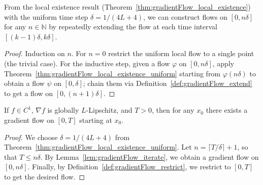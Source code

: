 \begin{lemma}
  \label{lem:gradientFlow_iterate}
  \leanok{}
  From the local existence result (Theorem~\ref{thm:gradientFlow_local_existence}) with the uniform time step $\delta = 1/(4L+4)$,
  we can construct flows on $[0, n\delta]$ for any $n \in \mathbb{N}$ by repeatedly extending the flow at each time interval $[(k-1)\delta, k\delta]$.
\end{lemma}
\begin{proof}
  \leanok{}
  Induction on $n$. For $n=0$ restrict the uniform local flow to a single point (the trivial case).
  For the inductive step, given a flow $\varphi$ on $[0,n\delta]$, apply
  Theorem~\ref{thm:gradientFlow_local_existence_uniform} starting from $\varphi(n\delta)$ to obtain a
  flow $\psi$ on $[0,\delta]$; chain them via Definition~\ref{def:gradientFlow_extend} to get a flow
  on $[0,(n+1)\delta]$.
\end{proof}


\begin{theorem}
  \label{thm:gradientFlow_existence}
  \leanok{}
  If $f\in C^1$, $\nabla f$ is globally $L$-Lipschitz, and $T>0$, then for any $x_0$
  there exists a gradient flow on $[0,T]$ starting at $x_0$.
\end{theorem}

\begin{proof}
  \leanok{}
  We choose $\delta = 1/(4L+4)$ from Theorem~\ref{thm:gradientFlow_local_existence_uniform}.
  Let $n = \lceil T/\delta \rceil + 1$, so that $T \le n\delta$.
  By Lemma~\ref{lem:gradientFlow_iterate}, we obtain a gradient flow on $[0,n\delta]$.
  Finally, by Definition~\ref{def:gradientFlow_restrict}, we restrict to $[0,T]$ to get the desired flow.
\end{proof}


